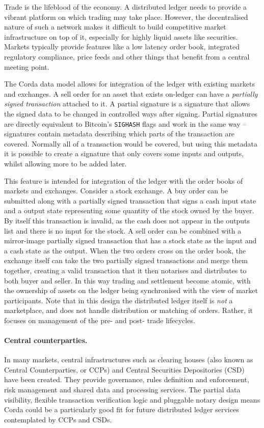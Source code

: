 \documentclass{article}
\begin{document}
Trade is the lifeblood of the economy. A distributed ledger needs to provide a vibrant platform on which trading may
take place. However, the decentralised nature of such a network makes it difficult to build competitive
market infrastructure on top of it, especially for highly liquid assets like securities. Markets typically provide
features like a low latency order book, integrated regulatory compliance, price feeds and other things that benefit
from a central meeting point.

The Corda data model allows for integration of the ledger with existing markets and exchanges. A sell order for
an asset that exists on-ledger can have a \emph{partially signed transaction} attached to it. A partial
signature is a signature that allows the signed data to be changed in controlled ways after signing. Partial signatures
are directly equivalent to Bitcoin's \texttt{SIGHASH} flags and work in the same way -- signatures contain metadata
describing which parts of the transaction are covered. Normally all of a transaction would be covered, but using this
metadata it is possible to create a signature that only covers some inputs and outputs, whilst allowing more to be
added later.

This feature is intended for integration of the ledger with the order books of markets and exchanges. Consider a stock
exchange. A buy order can be submitted along with a partially signed transaction that signs a cash input state
and a output state representing some quantity of the stock owned by the buyer. By itself this transaction is invalid,
as the cash does not appear in the outputs list and there is no input for the stock. A sell order can be combined with
a mirror-image partially signed transaction that has a stock state as the input and a cash state as the output. When
the two orders cross on the order book, the exchange itself can take the two partially signed transactions and merge
them together, creating a valid transaction that it then notarises and distributes to both buyer and seller. In this
way trading and settlement become atomic, with the ownership of assets on the ledger being synchronised with the view
of market participants. Note that in this design the distributed ledger itself is \emph{not} a marketplace, and does
not handle distribution or matching of orders. Rather, it focuses on management of the pre- and post- trade lifecycles.

\paragraph{Central counterparties.}In many markets, central infrastructures such as clearing houses (also known as
Central Counterparties, or CCPs) and Central Securities Depositories (CSD) have been created. They provide governance,
rules definition and enforcement, risk management and shared data and processing services. The partial data visibility,
flexible transaction verification logic and pluggable notary design means Corda could be a particularly good fit for
future distributed ledger services contemplated by CCPs and CSDs.
\end{document}
